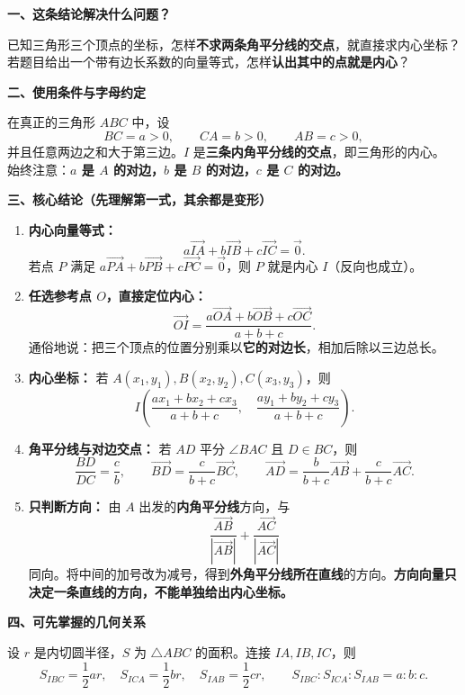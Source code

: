 

\begin{statementbox}
\textbf{一、这条结论解决什么问题？}

已知三角形三个顶点的坐标，怎样\textbf{不求两条角平分线的交点}，就直接求内心坐标？
若题目给出一个带有边长系数的向量等式，怎样\textbf{认出其中的点就是内心}？

\medskip
\textbf{二、使用条件与字母约定}

在真正的三角形 $ABC$ 中，设
\[
BC=a>0,\qquad CA=b>0,\qquad AB=c>0,
\]
并且任意两边之和大于第三边。$I$ 是\textbf{三条内角平分线的交点}，即三角形的内心。
始终注意：\textbf{$a$ 是 $A$ 的对边，$b$ 是 $B$ 的对边，$c$ 是 $C$ 的对边。}


\medskip
\textbf{三、核心结论（先理解第一式，其余都是变形）}
\begin{enumerate}
\item \textbf{内心向量等式：}
\[
\boxed{a\vec{IA}+b\vec{IB}+c\vec{IC}=\vec 0.}
\]
若点 $P$ 满足 $a\vec{PA}+b\vec{PB}+c\vec{PC}=\vec 0$，则 $P$ 就是内心 $I$（反向也成立）。
\item \textbf{任选参考点 $O$，直接定位内心：}
\[
\boxed{\vec{OI}=\frac{a\vec{OA}+b\vec{OB}+c\vec{OC}}{a+b+c}.}
\]
通俗地说：把三个顶点的位置分别乘以\textbf{它的对边长}，相加后除以三边总长。
\item \textbf{内心坐标：} 若 $A(x_1,y_1),B(x_2,y_2),C(x_3,y_3)$，则
\[
\boxed{I\left(\frac{ax_1+bx_2+cx_3}{a+b+c},\quad
\frac{ay_1+by_2+cy_3}{a+b+c}\right).}
\]
\item \textbf{角平分线与对边交点：} 若 $AD$ 平分 $\angle BAC$ 且 $D\in BC$，则
\[
\frac{BD}{DC}=\frac cb,\qquad
\boxed{\vec{BD}=\frac c{b+c}\vec{BC}},\qquad
\boxed{\vec{AD}=\frac b{b+c}\vec{AB}+\frac c{b+c}\vec{AC}}.
\]
\item \begin{minipage}[t]{\linewidth}\textbf{只判断方向：} 由 $A$ 出发的\textbf{内角平分线}方向，与
\[
\boxed{\frac{\vec{AB}}{|\vec{AB}|}+\frac{\vec{AC}}{|\vec{AC}|}}
\]
同向。将中间的加号改为减号，得到\textbf{外角平分线所在直线}的方向。\textbf{方向向量只决定一条直线的方向，不能单独给出内心坐标。}

\end{minipage}
\end{enumerate}

\textbf{四、可先掌握的几何关系}

设 $r$ 是内切圆半径，$S$ 为 $\triangle ABC$ 的面积。连接 $IA,IB,IC$，则
\[
S_{IBC}=\frac12 ar,\quad S_{ICA}=\frac12 br,\quad S_{IAB}=\frac12 cr,
\qquad \boxed{S_{IBC}:S_{ICA}:S_{IAB}=a:b:c.}
\]
\end{statementbox}
